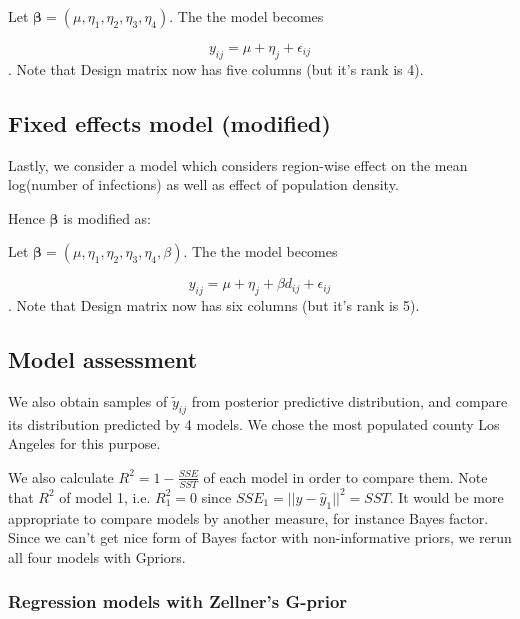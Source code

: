 \documentclass[11pt,twocolumn]{asaproc}
\begin{document}
Let $\pmb{\beta} =  (\mu, \eta_1, \eta_2, \eta_3, \eta_4)$. The the model becomes 
 
 $$y_{ij} = \mu + \eta_j + \epsilon_{ij}$$. Note that Design matrix now has five columns (but it's rank is 4). 
 




\subsection{Fixed effects model (modified)}

Lastly, we consider a model which considers region-wise effect on the mean log(number of infections) as well as effect of population density. 
 
Hence $\pmb{\beta}$ is modified as: 
 
 Let $\pmb{\beta} =  (\mu, \eta_1, \eta_2, \eta_3, \eta_4, \beta)$. The the model becomes 
 
 $$y_{ij} = \mu + \eta_j + \beta d_{ij} +  \epsilon_{ij}$$. Note that Design matrix now has six columns (but it's rank is 5). 
 




\subsection{Model assessment} %

We also obtain samples of $\tilde{y}_{ij}$ from posterior predictive distribution, and compare its distribution predicted by 4 models. We chose the most populated county Los Angeles for this purpose. 

We also calculate $R^2 = 1 - \frac{SSE}{SST}$ of each model in order to compare them. Note that $R^2$ of model 1, i.e. $R^2_1 = 0$ since $SSE_1 = ||y-\hat{y}_1||^2 = SST$. It would be more appropriate to compare models by another measure, for instance Bayes factor. Since we can't get nice form of Bayes factor with non-informative priors, we re\-run all four models with G\-priors. 

\subsubsection{Regression models with Zellner's G-prior}
\end{document}
